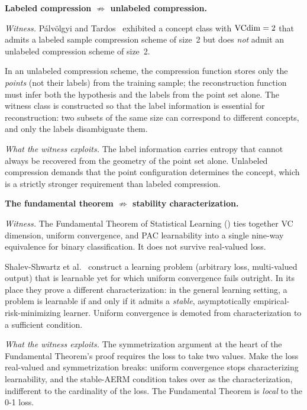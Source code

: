 
\begin{separation}
\textbf{Labeled compression $\not\Rightarrow$ unlabeled compression.}

\medskip\noindent
\emph{Witness.}
P\'alv\"olgyi and Tardos~\cite{PalvolgyiTardos2020} exhibited a
concept class with $\mathrm{VCdim} = 2$ that admits a labeled sample compression
scheme of size~2 but does \emph{not} admit an unlabeled compression
scheme of size~2.

In an unlabeled compression scheme, the compression function stores only
the \emph{points} (not their labels) from the training sample; the
reconstruction function must infer both the hypothesis and the labels
from the point set alone. The witness class is constructed so that the
label information is essential for reconstruction: two subsets of the
same size can correspond to different concepts, and only the labels
disambiguate them.

\medskip\noindent
\emph{What the witness exploits.}
The label information carries entropy that cannot always be recovered
from the geometry of the point set alone. Unlabeled compression demands
that the point configuration determines the concept, which is a strictly
stronger requirement than labeled compression.

\hfill\cite{PalvolgyiTardos2020}
\end{separation}


\begin{separation}
\textbf{The fundamental theorem $\not\Rightarrow$ stability
characterization.}

\medskip\noindent
\emph{Witness.}
The Fundamental Theorem of Statistical Learning () ties
together VC dimension, uniform convergence, and PAC learnability into a
single nine-way equivalence for binary classification. It does not
survive real-valued loss.

Shalev-Shwartz et al.~\cite{ShalevShwartzShamir2010} construct a
learning problem (arbitrary loss, multi-valued output) that is
learnable yet for which uniform convergence fails outright. In its place
they prove a different characterization: in the general learning setting,
a problem is learnable if and only if it admits a \emph{stable},
asymptotically empirical-risk-minimizing learner. Uniform convergence is
demoted from characterization to a sufficient condition.

\medskip\noindent
\emph{What the witness exploits.}
The symmetrization argument at the heart of the Fundamental Theorem's
proof requires the loss to take two values. Make the loss real-valued and
symmetrization breaks: uniform convergence stops characterizing
learnability, and the stable-AERM condition takes over as the
characterization, indifferent to the cardinality of the loss. The
Fundamental Theorem is \emph{local} to the 0-1 loss.

\hfill\cite{ShalevShwartzShamir2010}
\end{separation}


